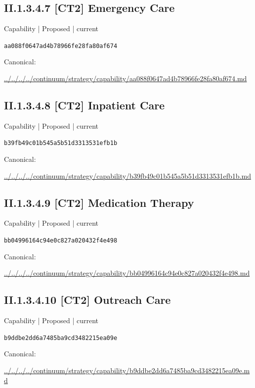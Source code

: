 \documentclass[10pt,a4paper]{article}
\begin{document}
\subsection*{II.1.3.4.7 [CT2] Emergency Care}
{\small Capability | Proposed | current}\par
\texttt{aa088f0647ad4b78966fe28fa80af674}\par
Canonical: \par
{\footnotesize\url{../../../../continuum/strategy/capability/aa088f0647ad4b78966fe28fa80af674.md}}\par
\subsection*{II.1.3.4.8 [CT2] Inpatient Care}
{\small Capability | Proposed | current}\par
\texttt{b39fb49c01b545a5b51d3313531efb1b}\par
Canonical: \par
{\footnotesize\url{../../../../continuum/strategy/capability/b39fb49c01b545a5b51d3313531efb1b.md}}\par
\subsection*{II.1.3.4.9 [CT2] Medication Therapy}
{\small Capability | Proposed | current}\par
\texttt{bb04996164c94e0c827a020432f4e498}\par
Canonical: \par
{\footnotesize\url{../../../../continuum/strategy/capability/bb04996164c94e0c827a020432f4e498.md}}\par
\subsection*{II.1.3.4.10 [CT2] Outreach Care}
{\small Capability | Proposed | current}\par
\texttt{b9ddbe2dd6a7485ba9cd3482215ea09e}\par
Canonical: \par
{\footnotesize\url{../../../../continuum/strategy/capability/b9ddbe2dd6a7485ba9cd3482215ea09e.md}}\par
\end{document}
